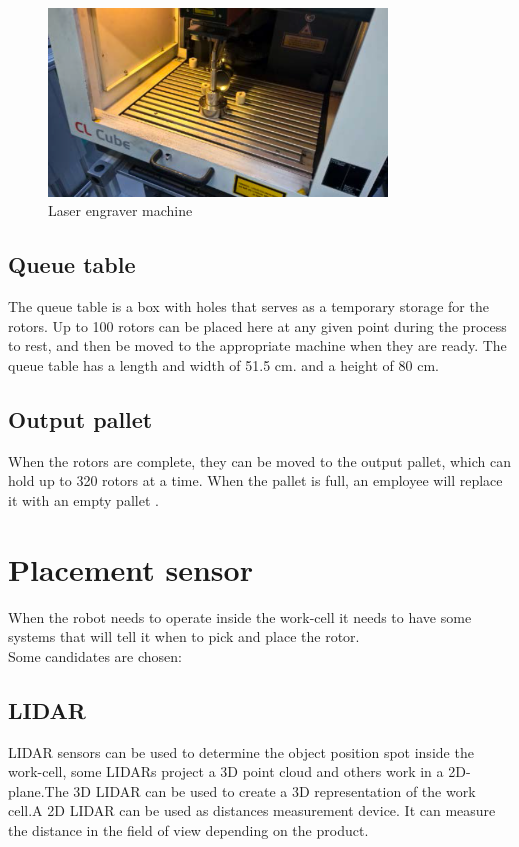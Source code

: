   \begin{figure}[H]
    \centering
    \includegraphics[width=9cm]{InitialProblemstatement/Case/engrave.PNG}
    \caption{Laser engraver machine\cite{Case}}
    \label{fig:Laserengravermachine}
  \end{figure}
  
 \subsection{Queue table}
 The queue table is a box with holes that serves as a temporary storage for the rotors. Up to 100 rotors can be placed here at any given point during the process to rest, and then be moved to the appropriate machine when they are ready. The queue table has a length and width of 51.5 cm. and a height of 80 cm\cite{Case}.\\  
 
 \subsection{Output pallet}
 When the rotors are complete, they can be moved to the output pallet, which can hold up to 320 rotors at a time. When the pallet is full, an employee will replace it with an empty pallet \cite{Case}.\\ 
 
 \section{Placement sensor}\label{ref:PlacementS}
 
 When the robot needs to operate inside the work-cell it needs to have some systems that will tell it when to pick and place the rotor.\\
 Some candidates are chosen:\\

 
  \subsection{LIDAR} 
  LIDAR sensors can be used to determine the object position spot inside the work-cell, some LIDARs project a 3D point cloud and others work in a 2D-plane\cite{LIDAR}.The 3D LIDAR can be used to create a 3D representation of the work cell.A 2D LIDAR can be used as distances measurement device. It can measure the distance in the field of view depending on the product\cite{LIDAR}.\\

